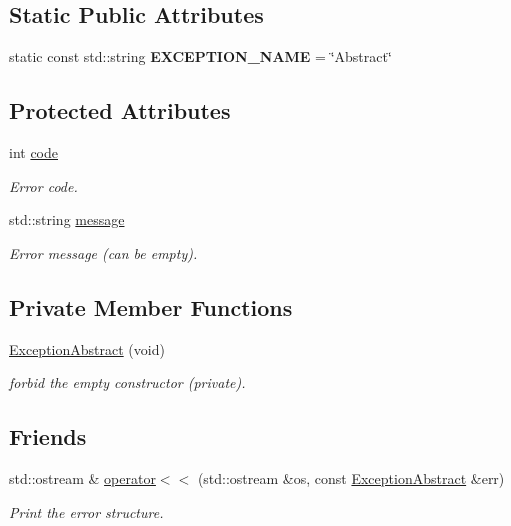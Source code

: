 \subsection*{Static Public Attributes}
\begin{DoxyCompactItemize}
\item 
static const std\+::string {\bfseries E\+X\+C\+E\+P\+T\+I\+O\+N\+\_\+\+N\+A\+ME} = \char`\"{}Abstract\char`\"{}\hypertarget{classdynamic__graph_1_1ExceptionAbstract_a3fe66d505c81575f26360298171c9e50}{}\label{classdynamic__graph_1_1ExceptionAbstract_a3fe66d505c81575f26360298171c9e50}

\end{DoxyCompactItemize}
\subsection*{Protected Attributes}
\begin{DoxyCompactItemize}
\item 
int \hyperlink{classdynamic__graph_1_1ExceptionAbstract_a160cf3cd35aad75738f8b26c5cec6fdc}{code}
\begin{DoxyCompactList}\small\item\em Error code. \end{DoxyCompactList}\item 
std\+::string \hyperlink{classdynamic__graph_1_1ExceptionAbstract_a9622b93d152c08ab80ed4b48ea24380b}{message}
\begin{DoxyCompactList}\small\item\em Error message (can be empty). \end{DoxyCompactList}\end{DoxyCompactItemize}
\subsection*{Private Member Functions}
\begin{DoxyCompactItemize}
\item 
\hyperlink{classdynamic__graph_1_1ExceptionAbstract_a474009850ce7a50c121e4c4294181e79}{Exception\+Abstract} (void)
\begin{DoxyCompactList}\small\item\em forbid the empty constructor (private). \end{DoxyCompactList}\end{DoxyCompactItemize}
\subsection*{Friends}
\begin{DoxyCompactItemize}
\item 
std\+::ostream \& \hyperlink{classdynamic__graph_1_1ExceptionAbstract_af1ab4fed15cda5c7de2c9c4f809bd611}{operator$<$$<$} (std\+::ostream \&os, const \hyperlink{classdynamic__graph_1_1ExceptionAbstract}{Exception\+Abstract} \&err)
\begin{DoxyCompactList}\small\item\em Print the error structure. \end{DoxyCompactList}\end{DoxyCompactItemize}


